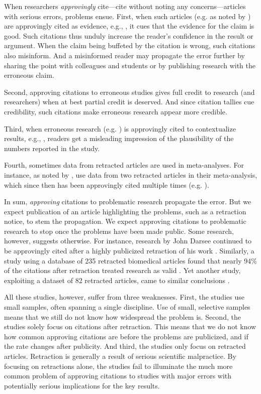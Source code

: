 \documentclass[12pt]{article}
\begin{document}
When researchers \textit{approvingly} cite---cite without noting any concerns---articles with serious errors, problems ensue. First, when such articles (e.g. \cite{rubio2005spontaneous} as noted by \cite{torsvik2010spontaneous}) are approvingly cited as evidence, e.g., \cite{chang2013safety}, it cues that the evidence for the claim is good. Such citations thus unduly increase the reader's confidence in the result or argument. When the claim being buffeted by the citation is wrong, such citations also misinform. And a misinformed reader may propagate the error further by sharing the point with colleagues and students or by publishing research with the erroneous claim.

Second, approving citations to erroneous studies gives full credit to research (and researchers) when at best partial credit is deserved. And since citation tallies cue credibility, such citations make erroneous research appear more credible.

Third, when erroneous research (e.g. \cite{rubio2005spontaneous}) is approvingly cited to contextualize results, e.g., \cite{kosaka2012therapeutic}, readers get a misleading impression of the plausibility of the numbers reported in the study.

Fourth, sometimes data from retracted articles are used in meta-analyses. For instance, as noted by \cite{paul2015comment}, \cite{lin2013perioperative} use data from two retracted articles in their meta-analysis, which since then has been approvingly cited multiple times (e.g. \cite{russo2017perioperative}). 

In sum, \textit{approving} citations to problematic research propagate the error. But we expect publication of an article highlighting the problems, such as a retraction notice, to stem the propagation. We expect approving citations to problematic research to stop once the problems have been made public. Some research, however, suggests otherwise. For instance, research by John Darsee continued to be approvingly cited after a highly publicized retraction of his work \cite{kochan1992persistence}. Similarly, a study using a database of 235 retracted biomedical articles found that nearly 94\% of the citations after retraction treated research as valid \cite{budd1998phenomena}. Yet another study, exploiting a dataset of 82 retracted articles, came to similar conclusions \cite{pfeifer1990continued}.

All these studies, however, suffer from three weaknesses. First, the studies use small samples, often spanning a single discipline. Use of small, selective samples means that we still do not know how widespread the problem is. Second, the studies solely focus on citations after retraction. This means that we do not know how common approving citations are before the problems are publicized, and if the rate changes after publicity. And third, the studies only focus on retracted articles. Retraction is generally a result of serious scientific malpractice. By focusing on retractions alone, the studies fail to illuminate the much more common problem of approving citations to studies with major errors with potentially serious implications for the key results.  
\end{document}

